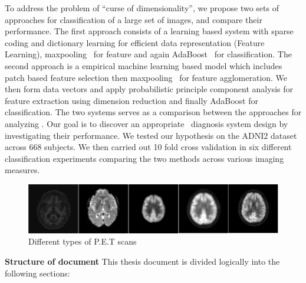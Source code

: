 To address the problem of ``curse of dimensionality'', we propose two sets of approaches for classification of a large set of \FDGPET images, and compare their performance. The first approach consists of a learning based system with sparse coding and dictionary learning for efficient data representation (Feature Learning), maxpooling~\citep{boureau2010theoretical} for feature and again AdaBoost~\citep{rojas2009adaboost} for classification. The second approach is a empirical machine learning based model which includes patch based feature selection then maxpooling~\citep{boureau2010theoretical} for feature agglomeration. We then form data vectors and apply probabilistic principle component analysis for feature extraction using dimension reduction and finally AdaBoost for classification. The two systems serves as a comparison between the approaches for analyzing \FDGPET. Our goal is to discover an appropriate \FDGPET ~diagnosis system design by investigating their performance. We tested our hypothesis on the ADNI2 dataset across $668$ subjects. We then carried out 10 fold cross validation in six different classification experiments comparing the two methods across various imaging measures.

\begin{figure}[h]
	\centering
	\includegraphics[width=\linewidth]{figures/pet_raw.png}
	\caption{Different types of P.E.T scans}
	\label{fig:pet_raw}
\end{figure}

{\bf Structure of document} This thesis document is divided logically into the following sections:

